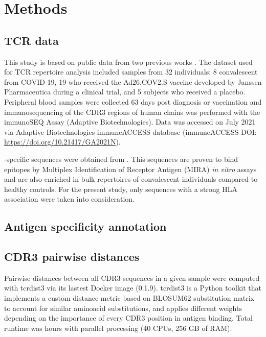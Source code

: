 \chapter{Methods}


\section*{TCR data}

This study is based on public data from two previous works \citep{janssen, metaclonotypes}. The dataset used for TCR repertoire analysis included samples from 32 individuals: 8 convalescent from COVID-19, 19 who received the Ad26.COV2.S vaccine developed by Janssen Pharmaceutica during a clinical trial, and 5 subjects who received a placebo. Peripheral blood samples were collected 63 days post diagnosis or vaccination and immunosequencing of the CDR3 regions of human \TCRB{} chains was performed with the immunoSEQ Assay (Adaptive Biotechnologies). Data was accessed on July 2021 via Adaptive Biotechnologies immuneACCESS database (immuneACCESS DOI: \url{https://doi.org/10.21417/GA2021N}).

\covid-specific \TCRB{} sequences were obtained from \cite{metaclonotypes}. This sequences are proven to bind \covid{} epitopes by Multiplex Identification of Receptor Antigen (MIRA) \textit{in vitro} assays and are also enriched in bulk \TCRB{} repertoires of convalescent individuals compared to healthy controls. For the present study, only \TCRB{} sequences with a strong HLA association were taken into consideration.

\section*{Antigen specificity annotation}

\section*{CDR3 pairwise distances}

Pairwise distances between all CDR3 sequences in a given sample were computed with tcrdist3 \citep{tcrdist, metaclonotypes} via its lastest Docker image (0.1.9). tcrdist3 is a Python toolkit that implements a custom distance metric based on BLOSUM62 substitution matrix to account for similar aminoacid substitutions, and applies different weights depending on the importance of every CDR3 position in antigen binding. Total runtime was  hours with parallel processing (40 CPUs, 256 GB of RAM).

